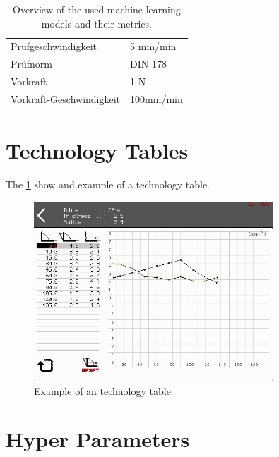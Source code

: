 \begin{table}[H]
\begin{tcolorbox}[arc=0pt,boxrule=0.5pt]
\begin{tabular}{ll}
            Prüfgeschwindigkeit                   & 5 mm/min             \\
            Prüfnorm                              & DIN 178              \\
            Vorkraft                              & 1 N                  \\
            Vorkraft-Geschwindigkeit              & 100mm/min            \\
            \bottomrule
        \end{tabular}
    \end{tcolorbox}
    \caption{Overview of the used machine learning models and their metrics.}
    \label{tab:machine-config}
\end{table}


\section{Technology Tables}\label{sec:technology-tables}

The \cref{fig:technology-table} show and example of a technology table.

\begin{figure}[h]
    \begin{tcolorbox}[arc=0pt,boxrule=0.5pt]
        \centering
        \includegraphics[width=0.8\textwidth, clip]{appA/images/schwenkbiegen_1}
    \end{tcolorbox}
    \caption{Example of an technology table.}
    \label{fig:technology-table}
\end{figure}

\section{Hyper Parameters}\label{sec:hyper-parameters}

